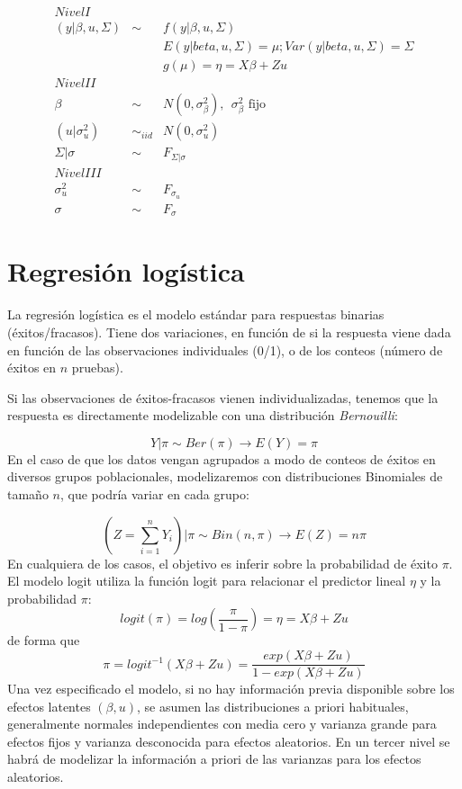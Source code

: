 \documentclass[
]{book}
\begin{document}
\begin{eqnarray*}
Nivel I &&\\
( y | \beta,u,\Sigma) &\sim & f(y|\beta,u,\Sigma) \\
&& E(y|beta,u,\Sigma)=\mu;  Var(y|beta,u,\Sigma)=\Sigma \\
&& g(\mu)=\eta=X\beta + Z u \\
Nivel II &&\\
\beta &\sim & N(0,\sigma_{\beta}^2), \ \ \sigma_{\beta}^2 \text{ fijo} \\
(u|\sigma_u^2) &\sim_{iid}&  N(0,{\sigma_u^2}) \\
\Sigma|\sigma &\sim& F_{\Sigma|\sigma} \\
Nivel III &&\\
\sigma_u^2 &\sim&  F_{\sigma_u} \\
\sigma &\sim&  F_{\sigma}
\end{eqnarray*}

\hypertarget{regresiuxf3n-loguxedstica}{%
\section{Regresión logística}\label{regresiuxf3n-loguxedstica}}

La regresión logística es el modelo estándar para respuestas binarias
(éxitos/fracasos). Tiene dos variaciones, en función de si la respuesta
viene dada en función de las observaciones individuales (0/1), o de los
conteos (número de éxitos en \(n\) pruebas).

Si las observaciones de éxitos-fracasos vienen individualizadas, tenemos
que la respuesta es directamente modelizable con una distribución
\emph{Bernouilli}:

\[Y|\pi \sim Ber(\pi) \rightarrow E(Y)=\pi\] En el caso de que los datos
vengan agrupados a modo de conteos de éxitos en diversos grupos
poblacionales, modelizaremos con distribuciones Binomiales de tamaño
\(n\), que podría variar en cada grupo:

\[(Z=\sum_{i=1}^n Y_i)|\pi\sim Bin(n,\pi)\rightarrow E(Z)=n\pi\] En
cualquiera de los casos, el objetivo es inferir sobre la probabilidad de
éxito \(\pi\). El modelo logit utiliza la función logit para relacionar el
predictor lineal \(\eta\) y la probabilidad \(\pi\):
\[logit(\pi)=log\left(\frac{\pi}{1-\pi}\right)=\eta=X\beta+Zu\] de forma
que
\[\pi=logit^{-1}(X\beta+Zu)=\frac{exp(X\beta+Zu)}{1-exp(X\beta+Zu)}\]
Una vez especificado el modelo, si no hay información previa disponible
sobre los efectos latentes \((\beta,u)\), se asumen las distribuciones a
priori habituales, generalmente normales independientes con media cero y
varianza grande para efectos fijos y varianza desconocida para efectos
aleatorios. En un tercer nivel se habrá de modelizar la información a
priori de las varianzas para los efectos aleatorios.
\end{document}
